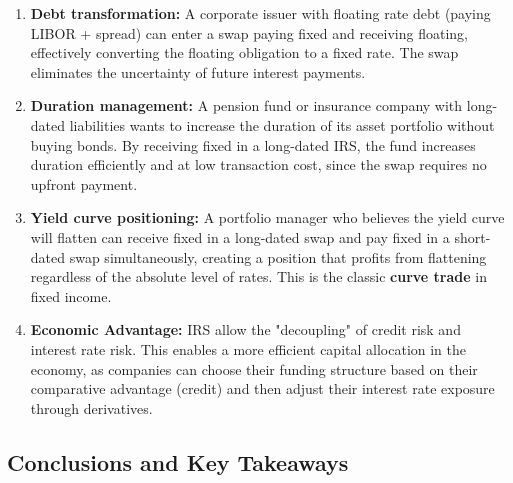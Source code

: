 \documentclass{article}
\theoremstyle{definition}  %
\theoremstyle{plain}  %
\numberwithin{definition}{section}
\numberwithin{proposition}{section}
\numberwithin{theorem}{section}
\numberwithin{equation}{section}
\begin{document}
\begin{enumerate}
    \item \textbf{Debt transformation:} A corporate issuer with floating rate debt (paying LIBOR + spread) can enter a swap paying fixed and receiving floating, effectively converting the floating obligation to a fixed rate. The swap eliminates the uncertainty of future interest payments.

    \item \textbf{Duration management:} A pension fund or insurance company with long-dated liabilities wants to increase the duration of its asset portfolio without buying bonds. By receiving fixed in a long-dated IRS, the fund increases duration efficiently and at low transaction cost, since the swap requires no upfront payment.

    \item \textbf{Yield curve positioning:} A portfolio manager who believes the yield curve will flatten can receive fixed in a long-dated swap and pay fixed in a short-dated swap simultaneously, creating a position that profits from flattening regardless of the absolute level of rates. This is the classic \textbf{curve trade} in fixed income.

    \item \textbf{Economic Advantage:} IRS allow the "decoupling" of credit risk and interest rate risk. This enables a more efficient capital allocation in the economy, as companies can choose their funding structure based on their comparative advantage (credit) and then adjust their interest rate exposure through derivatives.
\end{enumerate}

\subsection{Conclusions and Key Takeaways}
\end{document}
